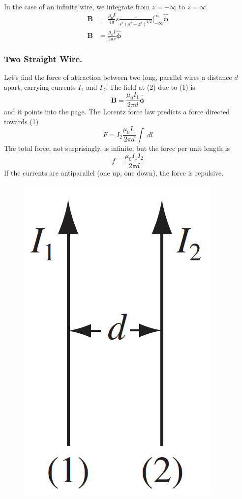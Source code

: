 \documentclass[../../../main.tex]{subfiles}
\begin{document}
In the case of an inﬁnite wire, we integrate from $z=-\infty$ to $z=\infty$
\begin{align*}
    \mathbf{B}&=\frac{\mu_0 I}{4\pi}s\frac{z}{s^2(s^2+z^2)^{1/2}}\bigg|_{- \infty}^{\infty}\boldsymbol{\hat{\phi}}\\
    \mathbf{B}&=\frac{\mu_0 I}{2\pi s}\boldsymbol{\hat{\phi}}
\end{align*}

\subsubsection*{Two Straight Wire.}  Let’s ﬁnd the force of attraction between two long, parallel 
wires a distance $d$ apart, carrying currents $I_1$ and $I_2$. The ﬁeld at (2) due to (1) is
\begin{equation*}
    \mathbf{B}=\frac{\mu_0 I_1}{2\pi d}\boldsymbol{\hat{\phi}}
\end{equation*}
and it points into the page. The Lorentz force law predicts a force directed towards (1)
\begin{equation*}
    F=I_2\frac{\mu_0 I_1}{2\pi d}\int\;dl
\end{equation*}
The total force, not surprisingly, is inﬁnite, but the force per unit length is
\begin{equation*}
    f=\frac{\mu_0 I_1I_2}{2\pi d}
\end{equation*}
If the currents are antiparallel (one up, one down), the force is repulsive.
\begin{figure}[ht]
    \centering
    \includegraphics[height=0.3\textwidth]{../Rss/Electromagnetism/Magnetostatics/StraightWire2.png}
\end{figure}
\end{document}
